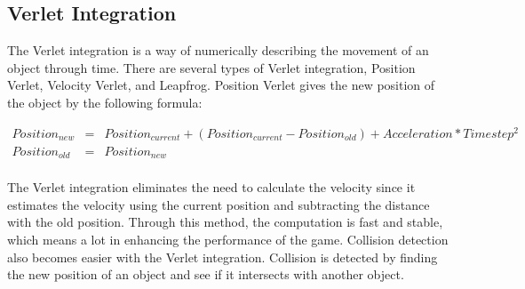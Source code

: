 \subsection{Verlet Integration}
The Verlet integration is a way of numerically describing  the movement of an object through
time\cite{Bitterli09}. There are several types of Verlet integration, Position Verlet, Velocity 
Verlet, and Leapfrog. Position Verlet gives the new position of the object by the following 
formula:

\begin{eqnarray}
Position_{new}  & = &
Position_{current} + 
(Position_{current} - Position_{old}) +
Acceleration * Timestep^2 \nonumber \\
Position_{old} & = & Position_{new} \nonumber \\
\label{Verlet}
\end{eqnarray}

The Verlet integration eliminates the need to calculate the velocity since it estimates 
the velocity using the current position and subtracting the distance with the old position. 
Through this method, the computation is fast and stable, which means a lot in enhancing the
performance of the game. Collision detection also becomes easier with the Verlet integration.
Collision is detected by finding the new position of an object and see if it intersects with
another object.


